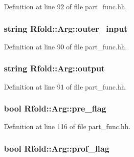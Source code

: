 Definition at line 92 of file part\+\_\+func.\+hh.

\hypertarget{class_rfold_1_1_arg_ae62e02353945f6073c46c27c7f583649}{
\subsubsection[{outer\+\_\+input}]{\setlength{\rightskip}{0pt plus 5cm}string Rfold\+::\+Arg\+::outer\+\_\+input}}\label{class_rfold_1_1_arg_ae62e02353945f6073c46c27c7f583649}


Definition at line 90 of file part\+\_\+func.\+hh.

\hypertarget{class_rfold_1_1_arg_a172c943d9eafc1bfc27fde48db831f5d}{
\subsubsection[{output}]{\setlength{\rightskip}{0pt plus 5cm}string Rfold\+::\+Arg\+::output}}\label{class_rfold_1_1_arg_a172c943d9eafc1bfc27fde48db831f5d}


Definition at line 91 of file part\+\_\+func.\+hh.

\hypertarget{class_rfold_1_1_arg_a8a7ca4df7e6085e8cc4af60917c99a92}{
\subsubsection[{pre\+\_\+flag}]{\setlength{\rightskip}{0pt plus 5cm}bool Rfold\+::\+Arg\+::pre\+\_\+flag}}\label{class_rfold_1_1_arg_a8a7ca4df7e6085e8cc4af60917c99a92}


Definition at line 116 of file part\+\_\+func.\+hh.

\hypertarget{class_rfold_1_1_arg_ada0e4aafdcedc01f9891d523f2626226}{
\subsubsection[{prof\+\_\+flag}]{\setlength{\rightskip}{0pt plus 5cm}bool Rfold\+::\+Arg\+::prof\+\_\+flag}}\label{class_rfold_1_1_arg_ada0e4aafdcedc01f9891d523f2626226}


